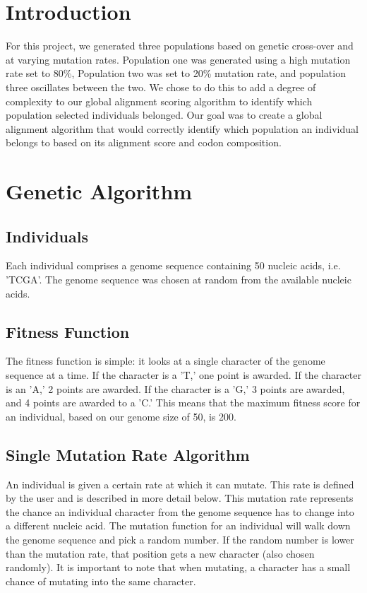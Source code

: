 \documentclass[a4paper, 12pt, one column]{article}
\begin{document}
\begin{multicols}{2}

\section{Introduction}
\par For this project, we generated three populations based on genetic cross-over and at varying mutation rates. Population one was generated using a high mutation rate set to  80\%, Population two was set to 20\% mutation rate, and population three oscillates between the two. We chose to do this to add a degree of complexity to our global alignment scoring algorithm to identify which population selected individuals belonged. Our goal was to create a global alignment algorithm that would correctly identify which population an individual belongs to based on its alignment score and codon composition. 
\section{Genetic Algorithm}
\subsection{Individuals}

Each individual comprises a genome sequence containing 50 nucleic acids, i.e. 'TCGA'. The genome sequence was chosen at random from the available nucleic acids.

\subsection{Fitness Function}

The fitness function is simple: it looks at a single character of the genome sequence at a time. If the character is a 'T,' one point is awarded. If the character is an 'A,' 2 points are awarded. If the character is a 'G,' 3 points are awarded, and 4 points are awarded to a 'C.' This means that the maximum fitness score for an individual, based on our genome size of 50, is 200.

\subsection{Single Mutation Rate Algorithm}

An individual is given a certain rate at which it can mutate. This rate is defined by the user and is described in more detail below. This mutation rate represents the chance an individual character from the genome sequence has to change into a different nucleic acid. The mutation function for an individual will walk down the genome sequence and pick a random number. If the random number is lower than the mutation rate, that position gets a new character (also chosen randomly). 
It is important to note that when mutating, a character has a small chance of mutating into the same character.


\end{multicols}
\end{document}
